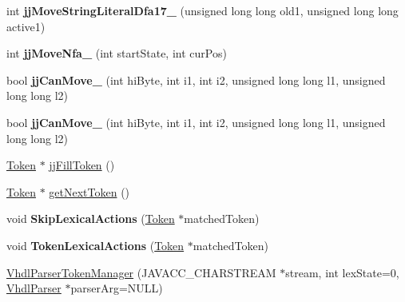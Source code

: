 \begin{DoxyCompactItemize}
int {\bfseries jj\+Move\+String\+Literal\+Dfa17\+\_} (unsigned long long old1, unsigned long long active1)
\item 
\mbox{\label{classvhdl_1_1parser_1_1_vhdl_parser_token_manager_a77c7cba4235a5481100599a8a94b2726}} 
int {\bfseries jj\+Move\+Nfa\+\_} (int start\+State, int cur\+Pos)
\item 
\mbox{\label{classvhdl_1_1parser_1_1_vhdl_parser_token_manager_a3f30861371198cce27c86dfae0c82504}} 
bool {\bfseries jj\+Can\+Move\+\_} (int hi\+Byte, int i1, int i2, unsigned long long l1, unsigned long long l2)
\item 
\mbox{\label{classvhdl_1_1parser_1_1_vhdl_parser_token_manager_acf6f02dbe13a50624c0463a57cc37700}} 
bool {\bfseries jj\+Can\+Move\+\_} (int hi\+Byte, int i1, int i2, unsigned long long l1, unsigned long long l2)
\item 
\mbox{\hyperlink{classvhdl_1_1parser_1_1_token}{Token}} $\ast$ \mbox{\hyperlink{classvhdl_1_1parser_1_1_vhdl_parser_token_manager_a575e793ba868b3e91ee00a3fd2315073}{jj\+Fill\+Token}} ()
\item 
\mbox{\hyperlink{classvhdl_1_1parser_1_1_token}{Token}} $\ast$ \mbox{\hyperlink{classvhdl_1_1parser_1_1_vhdl_parser_token_manager_ac17f53300a62b7e188710e1c0bdbc1dc}{get\+Next\+Token}} ()
\item 
\mbox{\label{classvhdl_1_1parser_1_1_vhdl_parser_token_manager_aaf3e9777b25cd23111cf8d3e0b52b626}} 
void {\bfseries Skip\+Lexical\+Actions} (\mbox{\hyperlink{classvhdl_1_1parser_1_1_token}{Token}} $\ast$matched\+Token)
\item 
\mbox{\label{classvhdl_1_1parser_1_1_vhdl_parser_token_manager_a01b77f27be99993282299ea5556ee36e}} 
void {\bfseries Token\+Lexical\+Actions} (\mbox{\hyperlink{classvhdl_1_1parser_1_1_token}{Token}} $\ast$matched\+Token)
\item 
\mbox{\hyperlink{classvhdl_1_1parser_1_1_vhdl_parser_token_manager_ae4dadde3df1ebd8e99399d60716633f9}{Vhdl\+Parser\+Token\+Manager}} (J\+A\+V\+A\+C\+C\+\_\+\+C\+H\+A\+R\+S\+T\+R\+E\+AM $\ast$stream, int lex\+State=0, \mbox{\hyperlink{classvhdl_1_1parser_1_1_vhdl_parser}{Vhdl\+Parser}} $\ast$parser\+Arg=N\+U\+LL)

\end{DoxyCompactItemize}
